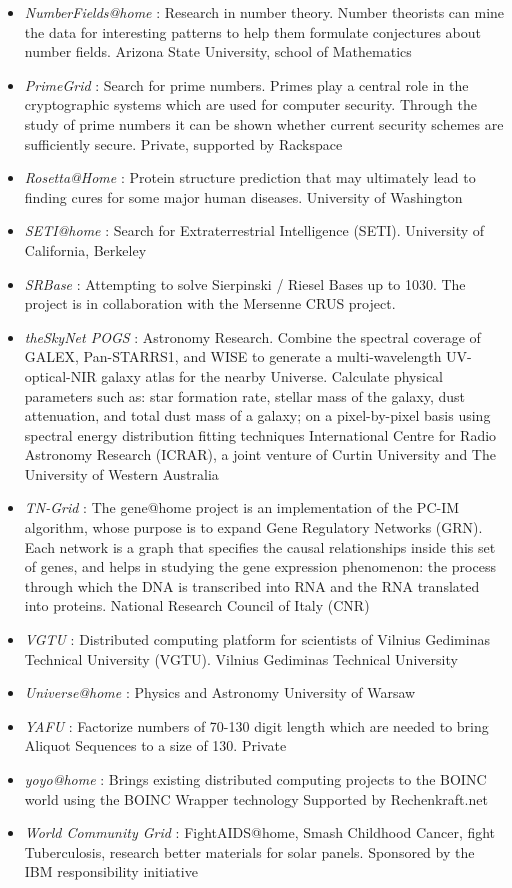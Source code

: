 \begin{itemize}
	\item {\em NumberFields@home} : Research in number theory. Number theorists can mine the data for interesting patterns to help them formulate conjectures about number fields.	Arizona State University, school of Mathematics	
	\item {\em PrimeGrid} : Search for prime numbers. Primes play a central role in the cryptographic systems which are used for computer security. Through the study of prime numbers it can be shown whether current security schemes are sufficiently secure.	Private, supported by Rackspace
	\item {\em Rosetta@Home} : Protein structure prediction that may ultimately lead to finding cures for some major human diseases.	University of Washington
	\item {\em SETI@home} : Search for Extraterrestrial Intelligence (SETI). University of California, Berkeley
	\item {\em SRBase} : Attempting to solve Sierpinski / Riesel Bases up to 1030.	The project is in collaboration with the Mersenne CRUS project.	
	\item {\em theSkyNet POGS} : Astronomy Research. Combine the spectral coverage of GALEX, Pan-STARRS1, and WISE to generate a multi-wavelength UV-optical-NIR galaxy atlas for the nearby Universe. Calculate physical parameters such as: star formation rate, stellar mass of the galaxy, dust attenuation, and total dust mass of a galaxy; on a pixel-by-pixel basis using spectral energy distribution fitting techniques	International Centre for Radio Astronomy Research (ICRAR), a joint venture of Curtin University and The University of Western Australia	
	\item {\em TN-Grid} : The gene@home project is an implementation of the PC-IM algorithm, whose purpose is to expand Gene Regulatory Networks (GRN). Each network is a graph that specifies the causal relationships inside this set of genes, and helps in studying the gene expression phenomenon: the process through which the DNA is transcribed into RNA and the RNA translated into proteins.	National Research Council of Italy (CNR)
	\item {\em VGTU} : Distributed computing platform for scientists of Vilnius Gediminas Technical University (VGTU).	Vilnius Gediminas Technical University
	\item {\em Universe@home} : Physics and Astronomy	University of Warsaw
	\item {\em YAFU} : Factorize numbers of 70-130 digit length which are needed to bring Aliquot Sequences to a size of 130.	Private	
	\item {\em yoyo@home} : Brings existing distributed computing projects to the BOINC world using the BOINC Wrapper technology	Supported by Rechenkraft.net 
	\item {\em World Community Grid} : FightAIDS@home, Smash Childhood Cancer, fight Tuberculosis, research better materials for solar panels.	Sponsored by the IBM responsibility initiative
	
\end{itemize}
		

